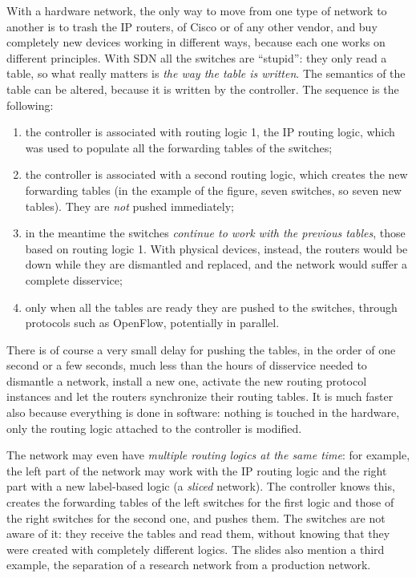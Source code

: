 With a hardware network, the only way to move from one type of network to another is to trash the IP routers, of Cisco or of any other vendor, and buy completely new devices working in different ways, because each one works on different principles. With SDN all the switches are ``stupid'': they only read a table, so what really matters is \emph{the way the table is written}. The semantics of the table can be altered, because it is written by the controller. The sequence is the following:

\begin{enumerate}
\item the controller is associated with routing logic 1, the IP routing logic, which was used to populate all the forwarding tables of the switches;
\item the controller is associated with a second routing logic, which creates the new forwarding tables (in the example of the figure, seven switches, so seven new tables). They are \emph{not} pushed immediately;
\item in the meantime the switches \emph{continue to work with the previous tables}, those based on routing logic 1. With physical devices, instead, the routers would be down while they are dismantled and replaced, and the network would suffer a complete disservice;
\item only when all the tables are ready they are pushed to the switches, through protocols such as OpenFlow, potentially in parallel.
\end{enumerate}

There is of course a very small delay for pushing the tables, in the order of one second or a few seconds, much less than the hours of disservice needed to dismantle a network, install a new one, activate the new routing protocol instances and let the routers synchronize their routing tables. It is much faster also because everything is done in software: nothing is touched in the hardware, only the routing logic attached to the controller is modified.

The network may even have \emph{multiple routing logics at the same time}: for example, the left part of the network may work with the IP routing logic and the right part with a new label-based logic (a \emph{sliced} network). The controller knows this, creates the forwarding tables of the left switches for the first logic and those of the right switches for the second one, and pushes them. The switches are not aware of it: they receive the tables and read them, without knowing that they were created with completely different logics. The slides also mention a third example, the separation of a research network from a production network.

